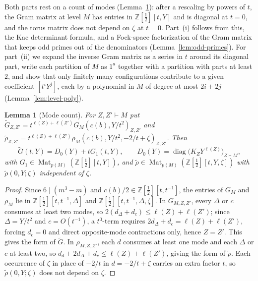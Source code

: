 \documentclass[twoside,10pt]{article}
\numberwithin{equation}{section}
\theoremstyle{slbody}
\newtheorem{lemma}[theorem]{Lemma}
\theoremstyle{definition}
\theoremstyle{remark}
\begin{document}
Both parts rest on a count of modes (Lemma~\ref{lem:mode-count}): after a
rescaling by powers of \(t\), the Gram matrix at level \(M\) has entries in
\(\mathbb Z[\tfrac12][t,Y]\) and is diagonal at \(t=0\), and the torus matrix
does not depend on \(\zeta\) at \(t=0\).  Part~(i) follows from this, the Kac
determinant formula, and a Fock-space factorization of the Gram matrix that
keeps odd primes out of the denominators (Lemma~\ref{lem:odd-primes}).  For
part~(ii) we expand the inverse Gram matrix as a series in \(t\) around its
diagonal part, write each partition of \(M\) as \(1^a\) together with a
partition with parts at least \(2\), and show that only finitely many
configurations contribute to a given coefficient \([t^iY^j]\), each by a
polynomial in \(M\) of degree at most \(2i+2j\) (Lemma~\ref{lem:level-poly}).

\begin{lemma}[Mode count]\label{lem:mode-count}
For \(Z,Z'\vdash M\) put
\(\widetilde G_{Z,Z'}=t^{\ell(Z)+\ell(Z')}G_{M}(c(b),Y/t^2)_{Z,Z'}\) and
\(\widetilde\rho_{Z,Z'}=t^{\ell(Z)+\ell(Z')}\rho_{M}(c(b),Y/t^2,-2/t+\zeta)_{Z,Z'}\).
Then
\[
 \widetilde G(t,Y)=D_0(Y)+tG_1(t,Y),\qquad
 D_0(Y)=\operatorname{diag}\bigl(K_ZY^{\ell(Z)}\bigr)_{Z\vdash M},
\]
with \(G_1\in\operatorname{Mat}_{p(M)}(\mathbb Z[\tfrac12][t,Y])\), and
\(\widetilde\rho\in\operatorname{Mat}_{p(M)}(\mathbb Z[\tfrac12][t,Y,\zeta])\) with
\(\widetilde\rho(0,Y;\zeta)\) independent of \(\zeta\).
\end{lemma}

\begin{proof}
Since \(6\mid(m^3-m)\) and \(c(b)/2\in\mathbb Z[\tfrac12][t,t^{-1}]\), the entries of
\(G_M\) and \(\rho_M\) lie in \(\mathbb Z[\tfrac12][t,t^{-1},\Delta]\) and
\(\mathbb Z[\tfrac12][t,t^{-1},\Delta,\zeta]\).
In \(G_{M,Z,Z'}\), every \(\Delta\) or \(c\) consumes at least two
modes, so \(2(d_\Delta+d_c)\leq\ell(Z)+\ell(Z')\); since
\(\Delta=Y/t^2\) and \(c=O(t^{-1})\), a \(t^0\)-term requires
\(2d_\Delta+d_c=\ell(Z)+\ell(Z')\), forcing \(d_c=0\) and direct
opposite-mode contractions only, hence \(Z=Z'\).  This gives the form of
\(\widetilde G\).
In \(\rho_{M,Z,Z'}\), each \(d\) consumes at least one mode and each
\(\Delta\) or \(c\) at least two, so
\(d_d+2d_\Delta+d_c\leq\ell(Z)+\ell(Z')\), giving the form of
\(\widetilde\rho\).  Each occurrence of \(\zeta\) in place of \(-2/t\) in
\(d=-2/t+\zeta\) carries an extra factor \(t\), so \(\widetilde\rho(0,Y;\zeta)\)
does not depend on \(\zeta\).
\end{proof}
\end{document}
